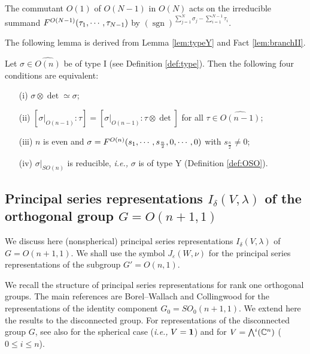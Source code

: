 The commutant $O(1)$ of $O(N-1)$ in $O(N)$ acts
 on the irreducible summand
 $F^{{O(N-1)}}({\tau_1, \cdots, \tau_{N-1}})$
 by 
$
   ({\operatorname{sgn}})^{\sum_{j=1}^N \sigma_j - \sum_{i=1}^{N-1} \tau_i}.
$  


The following lemma is derived from Lemma \ref{lem:typeY} and Fact \ref{lem:branchII}.  
\begin{lemma}
\label{lem:branchII}
Let $\sigma \in \widehat {O(n)}$
 be of type I (see Definition \ref{def:type}).  
Then the following four conditions are equivalent:
\begin{enumerate}
\item[{\rm{(i)}}]
$\sigma \otimes \det \simeq \sigma$; 
\item[{\rm{(ii)}}]
$[\sigma|_{O(n-1)}:\tau]=[\sigma|_{O(n-1)}:\tau \otimes \det]$
 for all $\tau \in \widehat {O(n-1)}$; 
\item[{\rm{(iii)}}]
$n$ is even and $\sigma =F^{{O(n)}}({s_1, \cdots, s_{\frac n 2}, 0, \cdots, 0})$
 with $s_{\frac n 2} \ne 0$;  
\item[{\rm{(iv)}}]
$\sigma|_{S O(n)}$ is reducible, 
 {\it{i.e.,}} $\sigma$ is of type Y
 (Definition \ref{def:OSO}).  
\end{enumerate}
\end{lemma}



\subsection{Principal series representations $I_{\delta}(V,\lambda)$
 of the orthogonal group $G=O(n+1,1)$}
\label{subsec:ps}

We discuss here (nonspherical) principal series representations
 $I_{\delta}(V,\lambda)$ of $G=O(n+1,1)$.  
We shall use the symbol 
 $J_{\varepsilon}(W,\nu)$
 for the principal series representations of the subgroup 
 $G'=O(n,1)$.  



We recall the structure of  principal series representations for  rank one orthogonal groups.  
The main references are Borel--Wallach \cite{BW}
 and Collingwood \cite[Chap.~5, Sect.~2]{C}
 for the representations
 of the identity component $G_0=SO_0(n+1,1)$.  
We extend  here the results to the disconnected group.  
For representations of the disconnected group $G$, 
 see also \cite[Chap.~2]{sbon}
 for the spherical case
 ({\it{i.e.,}} $V={\bf{1}}$) and \cite[Chap.~2, Sect.~3]{KKP}
 for $V=\Exterior^i({\mathbb{C}}^n)$
 ($0 \le i \le n$).  




